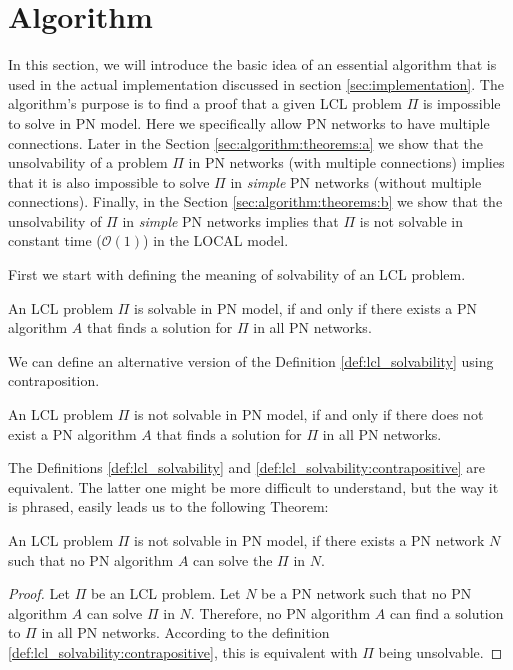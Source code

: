 
\section{Algorithm} \label{sec:algorithm}

In this section, we will introduce the basic idea of an essential algorithm that is used in the actual implementation discussed in section \ref{sec:implementation}.
The algorithm's purpose is to find a proof that a given LCL problem $\Pi$ is impossible to solve in PN model.
Here we specifically allow PN networks to have multiple connections.
Later in the Section \ref{sec:algorithm:theorems:a} we show that the unsolvability of a problem $\Pi$ in PN networks (with multiple connections) implies that it is also impossible to solve $\Pi$ in \emph{simple} PN networks (without multiple connections).
Finally, in the Section \ref{sec:algorithm:theorems:b} we show that the unsolvability of $\Pi$ in \emph{simple} PN networks implies that $\Pi$ is not solvable in constant time ($\mathcal{O}(1)$) in the LOCAL model.

First we start with defining the meaning of solvability of an LCL problem.
\begin{definition} \label{def:lcl_solvability}
    An LCL problem $\Pi$ is solvable in PN model, if and only if there exists a PN algorithm $A$ that finds a solution for $\Pi$ in all PN networks.
\end{definition}

We can define an alternative version of the Definition \ref{def:lcl_solvability} using contraposition.
\begin{definition} \label{def:lcl_solvability:contrapositive}
An LCL problem $\Pi$ is not solvable in PN model, if and only if there does not exist a PN algorithm $A$ that finds a solution for $\Pi$ in all PN networks.
\end{definition}

The Definitions \ref{def:lcl_solvability} and \ref{def:lcl_solvability:contrapositive} are equivalent. The latter one might be more difficult to understand, but the way it is phrased, easily leads us to the following Theorem:

\begin{theorem} \label{thm:lcl_nonsolvability}
    An LCL problem $\Pi$ is not solvable in PN model, if there exists a PN network $N$ such that no PN algorithm $A$ can solve the $\Pi$ in $N$.
\end{theorem}
\begin{proof}
    Let $\Pi$ be an LCL problem.
    Let $N$ be a PN network such that no PN algorithm $A$ can solve $\Pi$ in $N$.
    Therefore, no PN algorithm $A$ can find a solution to $\Pi$ in all PN networks.
    According to the definition \ref{def:lcl_solvability:contrapositive}, this is equivalent with $\Pi$ being unsolvable.
\end{proof}

